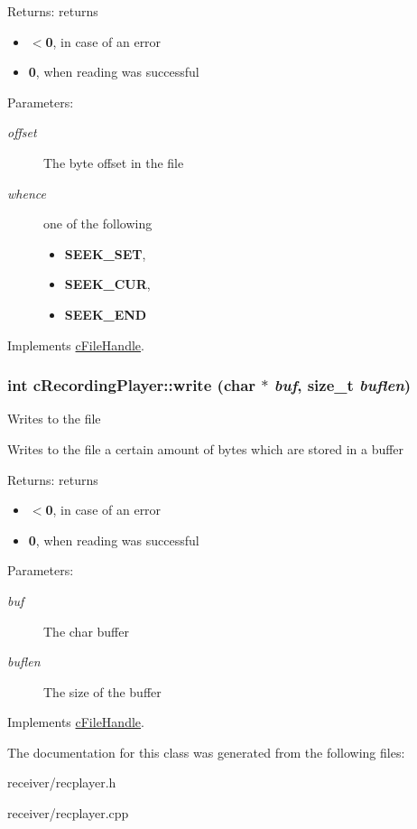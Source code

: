 \begin{Desc}
\item[Returns:]returns\begin{itemize}
\item {\bf $<$0}, in case of an error\item {\bf 0}, when reading was successful\end{itemize}
\end{Desc}
\begin{Desc}
\item[Parameters:]
\begin{description}
\item[{\em offset}]The byte offset in the file \item[{\em whence}]one of the following\begin{itemize}
\item {\bf SEEK\_\-SET},\item {\bf SEEK\_\-CUR},\item {\bf SEEK\_\-END} \end{itemize}
\end{description}
\end{Desc}


Implements \hyperlink{classcFileHandle_d2dde523301abe5e79e6109a93ba705b}{cFileHandle}.\hypertarget{classcRecordingPlayer_7dd0cb78ae8032eb677f01d71187d6e0}{
\subsubsection[{write}]{\setlength{\rightskip}{0pt plus 5cm}int cRecordingPlayer::write (char $\ast$ {\em buf}, \/  size\_\-t {\em buflen})}}
\label{classcRecordingPlayer_7dd0cb78ae8032eb677f01d71187d6e0}


Writes to the file

Writes to the file a certain amount of bytes which are stored in a buffer

\begin{Desc}
\item[Returns:]returns\begin{itemize}
\item {\bf $<$0}, in case of an error\item {\bf 0}, when reading was successful\end{itemize}
\end{Desc}
\begin{Desc}
\item[Parameters:]
\begin{description}
\item[{\em buf}]The char buffer \item[{\em buflen}]The size of the buffer \end{description}
\end{Desc}


Implements \hyperlink{classcFileHandle_e1495303f52f6f2d7ac37a030f78a937}{cFileHandle}.

The documentation for this class was generated from the following files:\begin{CompactItemize}
\item 
receiver/recplayer.h\item 
receiver/recplayer.cpp\end{CompactItemize}
